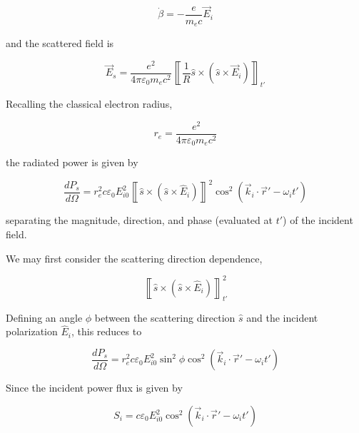 \begin{equation}\label{eq:betadot_nonrel}
 \dot{\beta} = -\frac{e}{m_e c}\vec{E}_i
\end{equation}

\noindent and the scattered field is

\begin{equation}\label{eq:LW_nonrel}
 \vec{E}_s = \frac{e^2}{4\pi\varepsilon_0 m_e c^2} \left\llbracket \frac{1}{R} \hat{s} \times \left(\hat{s}\times\vec{E}_i\right)\right\rrbracket_{t'}
\end{equation}

\noindent Recalling the classical electron radius,

\begin{equation}\label{eq:re}
 r_e = \frac{e^2}{4\pi \varepsilon_0 m_e c^2}
\end{equation}

\noindent the radiated power is given by

\begin{equation}\label{dPdOmega2}
 \frac{dP_s}{d\Omega} = r_e^2 c \varepsilon_0 E_{i0}^2 \left\llbracket \hat{s} \times \left( \hat{s} \times \hat{E}_i \right) \right\rrbracket^2 \cos^2 \left( \vec{k}_i \cdot \vec{r}' - \omega_i t' \right)
\end{equation}

\noindent separating the magnitude, direction, and phase (evaluated at $t'$) of the incident field.  

We may first consider the scattering direction dependence,

\begin{equation}
 \left\llbracket \hat{s} \times \left( \hat{s} \times \hat{E}_i \right) \right\rrbracket^2_{t'}
\end{equation}

\noindent Defining an angle $\phi$ between the scattering direction $\hat{s}$ and the incident polarization $\hat{E}_i$, this reduces to

\begin{equation}
 \frac{dP_s}{d\Omega} = r_e^2 c \varepsilon_0 E_{i0}^2 \sin^2 \phi \cos^2 \left( \vec{k}_i \cdot \vec{r}' - \omega_i t' \right)
\end{equation}

\noindent Since the incident power flux is given by

\begin{equation}
 S_i = c \varepsilon_0 E_{i0}^2 \cos^2 \left( \vec{k}_i \cdot \vec{r}' - \omega_i t' \right)
\end{equation}

